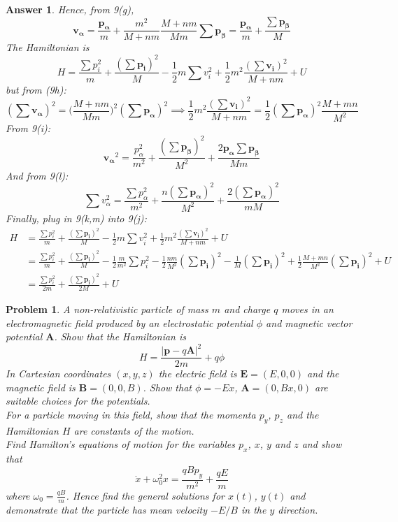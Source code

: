 \documentclass[a4paper]{article}
\newtheorem{ans}{Answer}[section]
\theoremstyle{new}
\newtheorem{qns}{Problem}[section]
\begin{document}
\begin{ans}
Hence, from 9(g),
\begin{equation}
\mathbf{v_\alpha}=\frac{\mathbf{p_\alpha}}{m}+\frac{m^2}{M+nm}\frac{M+nm}{Mm}\sum\mathbf{p_\beta}=\frac{\mathbf{p_\alpha}}{m}+\frac{\sum\mathbf{p_\beta}}{M}\tag{9i}
\end{equation}
The Hamiltonian is
\begin{equation}
H=\frac{\sum p_i^2}{m}+\frac{(\sum\mathbf{p_i})^2}{M}-\frac{1}{2}m\sum v_i^2+\frac{1}{2}m^2\frac{(\sum \mathbf{v_i})^2}{M+nm}+U\tag{9j}
\end{equation}
but from (9h):
\begin{equation}
(\sum\mathbf{v_\alpha})^2=\bigg(\frac{M+nm}{Mm}\bigg)^2(\sum\mathbf{p_\alpha})^2\implies\frac{1}{2}m^2\frac{(\sum\mathbf{v_i})^2}{M+nm}=\frac{1}{2}(\sum\mathbf{p_\alpha})^2\frac{M+mn}{M^2}\tag{9k}
\end{equation}
From 9(i):
\begin{equation}
\mathbf{v_\alpha}^2=\frac{p_\alpha^2}{m^2}+\frac{(\sum\mathbf{p_\beta})^2}{M^2}+\frac{2\mathbf{p_\alpha}\sum\mathbf{p_\beta}}{Mm}\tag{9l}
\end{equation}
And from 9(l): 
\begin{equation}
\sum v_\alpha^2=\frac{\sum p_\alpha^2}{m^2}+\frac{n(\sum \mathbf{p_\alpha})^2}{M^2}+\frac{2(\sum \mathbf{p_\alpha})^2}{mM}\tag{9m}
\end{equation}
Finally, plug in 9(k,m) into 9(j):
\begin{align}
    H&=\frac{\sum p_i^2}{m}+\frac{(\sum\mathbf{p_i})^2}{M}-\frac{1}{2}m\sum v_i^2+\frac{1}{2}m^2\frac{(\sum \mathbf{v_i})^2}{M+nm}+U\nonumber\\&=\frac{\sum p_i^2}{m}+\frac{(\sum\mathbf{p_i})^2}{M}-\frac{1}{2}\frac{m}{m^2}\sum p_i^2-\frac{1}{2}\frac{nm}{M^2}(\sum \mathbf{p_i})^2-\frac{1}{M}(\sum \mathbf{p_i})^2+\frac{1}{2}\frac{M+mn}{M^2}(\sum \mathbf{p_i})^2+U\nonumber\\&=\frac{\sum p_i^2}{2m}+\frac{(\sum \mathbf{p_i})^2}{2M}+U\nonumber
\end{align}
\end{ans}
\newpage
\begin{qns}
A non-relativistic particle of mass $m$ and charge $q$ moves in an electromagnetic field produced by an electrostatic potential $\phi$ and magnetic vector potential $\mathbf{A}$. Show that the Hamiltonian is 
$$H=\frac{|\mathbf{p}-q\mathbf{A}|^2}{2m}+q\phi$$
In Cartesian coordinates $(x,y,z)$ the electric field is $\mathbf{E}=(E,0,0)$ and the magnetic field is $\mathbf{B}=(0,0,B)$. Show that $\phi=-Ex$, $\mathbf{A}=(0,Bx,0)$ are suitable choices for the potentials.\\[5pt]
For a particle moving in this field, show that the momenta $p_y$, $p_z$ and the Hamiltonian $H$ are constants of the motion.\\[5pt]
Find Hamilton’s equations of motion for the variables $p_x$, $x$, $y$ and $z$ and show that
$$\ddot{x}+\omega_0^2x=\frac{qBp_y}{m^2}+\frac{qE}{m}$$
where $\omega_0=\frac{qB}{m}$. Hence find the general solutions for $x(t)$, $y(t)$ and demonstrate that the particle has mean velocity $-E/B$ in the $y$ direction.
\end{qns}
\end{document}
